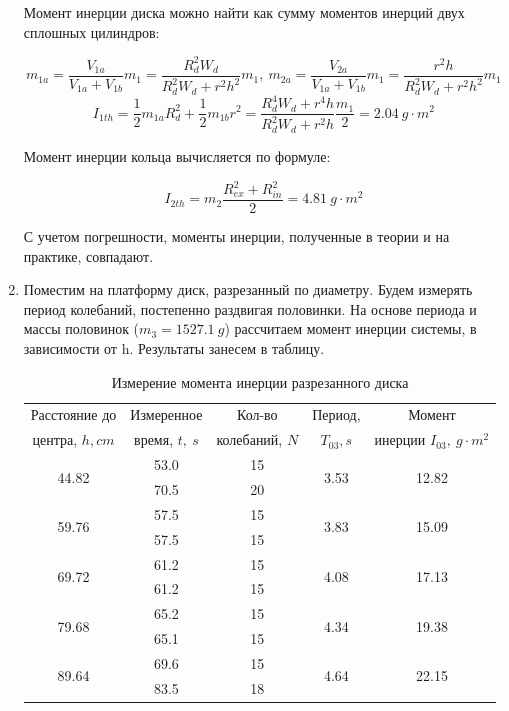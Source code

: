 \documentclass[14pt, a4paper]{article}
\begin{document}
\begin{enumerate}
Момент инерции диска можно найти как сумму моментов инерций двух сплошных цилиндров:

\[m_{1a}=\frac{V_{1a}}{V_{1a}+V_{1b}}m_1=\frac{R_d^2W_d}{R_d^2W_d+r^2h^2}m_1,\ m_{2a}=\frac{V_{2a}}{V_{1a}+V_{1b}}m_1=\frac{r^2h}{R_d^2W_d+r^2h^2}m_1\]
\[I_{1th}=\frac{1}{2}m_{1a}R_d^2+\frac{1}{2}m_{1b}r^2=\frac{R_d^4W_d+r^4h}{R_d^2W_d+r^2h}\frac{m_1}{2}=2.04\ g\cdot m^2\]

Момент инерции кольца вычисляется по формуле:

\[I_{2th}=m_2\frac{R_{ex}^2+R_{in}^2}{2}=4.81\ g\cdot m^2\]

С учетом погрешности, моменты инерции, полученные в теории и на практике, совпадают.

\item Поместим на платформу диск, разрезанный по диаметру. Будем измерять период колебаний, постепенно раздвигая половинки. На основе периода и массы половинок ($m_3=1527.1\ g$) рассчитаем момент инерции системы, в зависимости от h. Результаты занесем в таблицу.

\begin{table}[h]
\centering
\begin{tabular}{| c | c | c | c | c |}
\hline
Расстояние до & Измеренное & Кол-во & Период, & Момент \\
центра, $h, cm$ & время, $t,\ s$ &колебаний, $N$ & $T_{03}, s$ & инерции $I_{03},\ g\cdot m^2$ \\
\hline
\multirow{2}{*}{44.82} & 53.0 & 15 & \multirow{2}{*}{3.53} & \multirow{2}{*}{12.82} \\
\hline
& 70.5 & 20 & & \\
\hline
\multirow{2}{*}{59.76} & 57.5 & 15 & \multirow{2}{*}{3.83} & \multirow{2}{*}{15.09} \\
& 57.5 & 15 & & \\
\hline
\multirow{2}{*}{69.72} & 61.2 & 15 & \multirow{2}{*}{4.08} & \multirow{2}{*}{17.13} \\
& 61.2 & 15 & & \\
\hline
\multirow{2}{*}{79.68} & 65.2 & 15 & \multirow{2}{*}{4.34} & \multirow{2}{*}{19.38} \\
& 65.1 & 15 & & \\
\hline
\multirow{2}{*}{89.64} & 69.6 & 15 & \multirow{2}{*}{4.64} & \multirow{2}{*}{22.15} \\
& 83.5 & 18 & & \\
\hline
\end{tabular}
\label{table5}
\caption{Измерение момента инерции разрезанного диска}
\end{table}


\end{enumerate}
\end{document}
